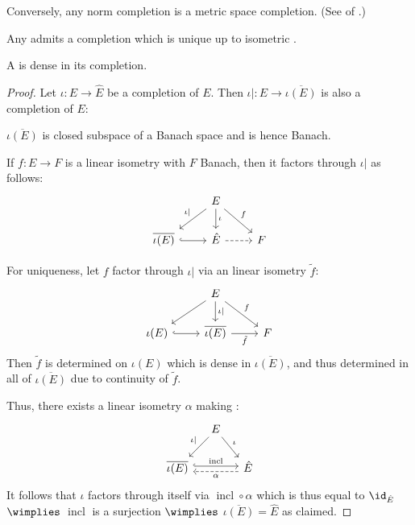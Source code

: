 	\begin{rmk}
		Conversely, any norm completion is a metric space completion. (See  of .)
	\end{rmk}
	
	
	\begin{cor}
		Any \NLS admits a completion which is unique up to isometric .
	\end{cor}
	
	
	\begin{prp}\label{PRP: NLS dense in completion}
		A \NLS is dense in its completion.
	\end{prp}
	
	\begin{proof}
		Let $\iota\colon E\to\hat E$ be a completion of $E$. Then $\iota|\colon E\to \overline{\iota(E)}$ is also a completion of $E$:
		\begin{prooflist}
			\item $\overline{\iota(E)}$ is closed subspace of a Banach space and is hence Banach.
			
			\item If $f\colon E\to F$ is a linear isometry with $F$ Banach, then it factors through $\iota|$ as follows:
			\[
			\begin{tikzcd}
				& E\ar[dl, "\iota|"']\ar[d, "\iota"]\ar[dr, "f"] &\\
				\overline{\iota(E)}\ar[r, hookrightarrow] & \hat E\ar[r, dashed] & F
			\end{tikzcd}
			\]
			
			For uniqueness, let $f$ factor through $\iota|$ via an linear isometry $\tilde f$:
			\[
			\begin{tikzcd}
				& E\ar[dl]\ar[d, "\iota|"]\ar[dr, "f"] &\\
				\iota(E)\ar[r, hookrightarrow] & \overline{\iota(E)}\ar[r, "\tilde f"'] & F
			\end{tikzcd}
			\]
			Then $\tilde f$ is determined on $\iota(E)$ which is dense in $\overline{\iota(E)}$, and thus determined in all of $\overline{\iota(E)}$ due to continuity of $\tilde f$.
		\end{prooflist}
		
		Thus, there exists a linear isometry $\alpha$ making \tfdc:
		\[
		\begin{tikzcd}[column sep=small]
			& E\ar[dl, "\iota|"']\ar[dr, "\iota"] &\\
		\overline{\iota(E)}\ar[rr, "\operatorname{incl}", hookrightarrow, shift left] & & \hat E\ar[ll, "\alpha", dashed, shift left]
		\end{tikzcd}
		\]
		It follows that $\iota$ factors through itself via $\operatorname{incl}\circ\alpha$ which is thus equal to $\id_{\hat E}$ $\wimplies$ $\operatorname{incl}$ is a surjection $\wimplies$ $\overline{\iota(E)} = \hat E$ as claimed.
	\end{proof}
	
